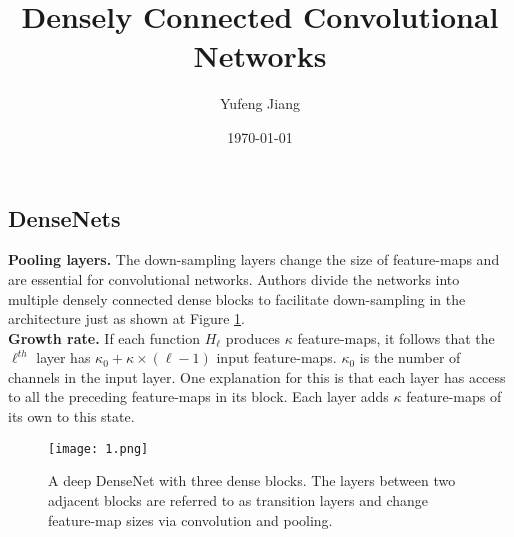 \documentclass[10pt,letterpaper]{article}
\title{Densely Connected Convolutional Networks}
\author{Yufeng Jiang}
\date{\today}
\begin{document}
\maketitle
\balance
\begin{multicols}{2}
\section{DenseNets}
{\bf Pooling layers.} The down-sampling layers change the size of feature-maps and are essential for convolutional networks. Authors divide the networks into multiple densely connected dense blocks to facilitate down-sampling in the architecture just as shown at Figure \ref{fig}. \\
{\bf Growth rate.} If each function $H_\ell$ produces $\kappa$ feature-maps, it follows that the $\ell^{th}$ layer has $\kappa_0 + \kappa \times (\ell-1)$ input feature-maps. $\kappa_0$ is the number of channels in the input layer. One explanation for this is that each layer has access to all the preceding feature-maps in its block. Each layer adds $\kappa$ feature-maps of its own to this state.\\
\end{multicols}
\begin{figure}[htbp]
\begin{center}
\texttt{[image: 1.png]}
\end{center}
\caption{A deep DenseNet with three dense blocks. The layers between two adjacent blocks are referred to as transition layers and change feature-map sizes via convolution and pooling.}
\label{fig}
\end{figure}
\end{document}
